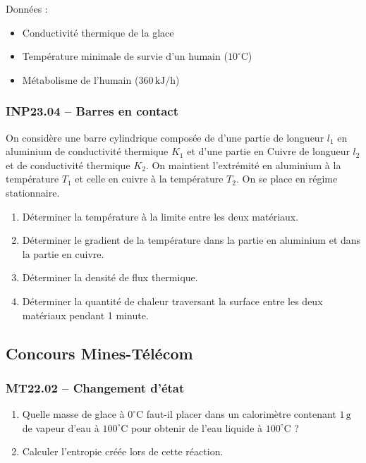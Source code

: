 Données :
\begin{itemize}
\item Conductivité thermique de la glace
\item Température minimale de survie d'un humain ($10^\circ\text{C}$)
\item Métabolisme de l'humain ($360\,\text{kJ/h}$)
\end{itemize}

\subsubsection*{INP23.04 -- Barres en contact }

On considère une barre cylindrique composée de d'une partie de longueur $l_{1}$ en aluminium de conductivité thermique $K_{1}$ et d'une partie en Cuivre de longueur $l_{2}$ et de conductivité thermique $K_{2}$. On maintient l'extrémité en aluminium à la température $T_{1}$ et celle en cuivre à la température $T_{2}$. On se place en régime stationnaire.

\begin{enumerate}
\item Déterminer la température à la limite entre les deux matériaux.
\item Déterminer le gradient de la température dans la partie en aluminium et dans la partie en cuivre.
\item Déterminer la densité de flux thermique.
\item Déterminer la quantité de chaleur traversant la surface entre les deux matériaux pendant 1 minute.
\end{enumerate}

\newpage
\subsection*{Concours Mines-Télécom}
\subsubsection*{MT22.02 -- Changement d'état  \corrige}

\begin{enumerate}
\item Quelle masse de glace à $0^\circ\text{C}$ faut-il placer dans un calorimètre contenant $1\,\text{g}$ de vapeur d'eau à $100^\circ\text{C}$ pour obtenir de l'eau liquide à $100^\circ\text{C}$ ?
\item Calculer l'entropie créée lors de cette réaction.
\end{enumerate}

